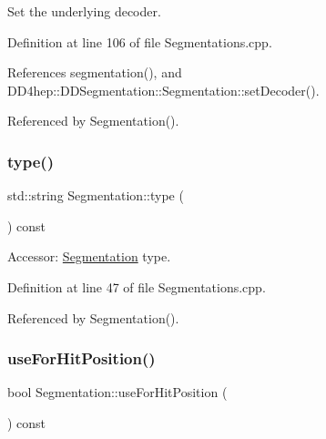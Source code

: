 Set the underlying decoder. 



Definition at line 106 of file Segmentations.\+cpp.



References segmentation(), and D\+D4hep\+::\+D\+D\+Segmentation\+::\+Segmentation\+::set\+Decoder().



Referenced by Segmentation().

\hypertarget{class_d_d4hep_1_1_geometry_1_1_segmentation_ad7ddeca9128936f2d36618f9342b13fe}{}\label{class_d_d4hep_1_1_geometry_1_1_segmentation_ad7ddeca9128936f2d36618f9342b13fe} 
\subsubsection{\texorpdfstring{type()}{type()}}
{\footnotesize\ttfamily std\+::string Segmentation\+::type (\begin{DoxyParamCaption}{ }\end{DoxyParamCaption}) const}



Accessor\+: \hyperlink{class_d_d4hep_1_1_geometry_1_1_segmentation}{Segmentation} type. 



Definition at line 47 of file Segmentations.\+cpp.



Referenced by Segmentation().

\hypertarget{class_d_d4hep_1_1_geometry_1_1_segmentation_a0f6595fe0d070d625472daa606cb50ba}{}\label{class_d_d4hep_1_1_geometry_1_1_segmentation_a0f6595fe0d070d625472daa606cb50ba} 
\subsubsection{\texorpdfstring{use\+For\+Hit\+Position()}{useForHitPosition()}}
{\footnotesize\ttfamily bool Segmentation\+::use\+For\+Hit\+Position (\begin{DoxyParamCaption}{ }\end{DoxyParamCaption}) const}



